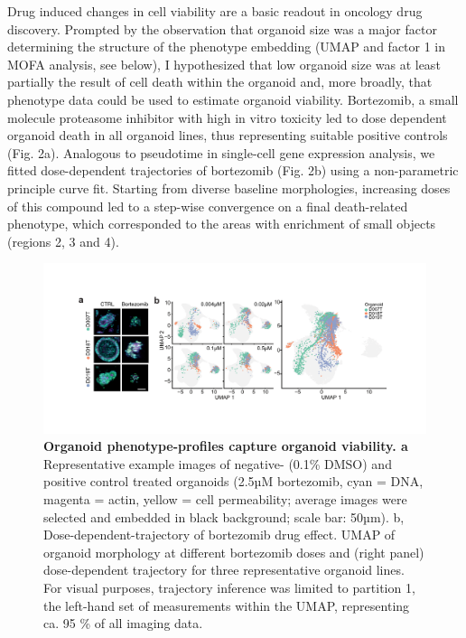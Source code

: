 \begin{flushleft}
Drug induced changes in cell viability are a basic readout in oncology drug discovery. Prompted by the observation that organoid size was a major factor determining the structure of the phenotype embedding (UMAP and factor 1 in MOFA analysis, see below), I hypothesized that low organoid size was at least partially the result of cell death within the organoid and, more broadly, that phenotype data could be used to estimate organoid viability. Bortezomib, a small molecule proteasome inhibitor with high in vitro toxicity led to dose dependent organoid death in all organoid lines, thus representing suitable positive controls (Fig. 2a). Analogous to pseudotime in single-cell  gene expression analysis, we fitted dose-dependent trajectories of bortezomib (Fig. 2b) using a non-parametric principle curve fit. Starting from diverse baseline morphologies, increasing doses of this compound led to a step-wise convergence on a final death-related phenotype, which corresponded to the areas with enrichment of small objects (regions 2, 3 and 4). 

\begin{figure}[h]
\centering
\includegraphics[width=\textwidth,
                height=\textheight,
                keepaspectratio]{figures/pdf/fig_160.pdf}
\caption{\textbf{Organoid phenotype-profiles capture organoid viability. a} Representative example images of negative- (0.1\% DMSO) and positive control treated organoids (2.5µM bortezomib, cyan = DNA, magenta = actin, yellow = cell permeability; average images were selected and embedded in black background; scale bar: 50µm). b, Dose-dependent-trajectory of bortezomib drug effect. UMAP of organoid morphology at different bortezomib doses and (right panel) dose-dependent trajectory for three representative organoid lines. For visual purposes, trajectory inference was limited to partition 1, the left-hand set of measurements within the UMAP, representing ca. 95 \% of all imaging data.}
\label{fig_160}
\end{figure}
\bigbreak


\end{flushleft}
